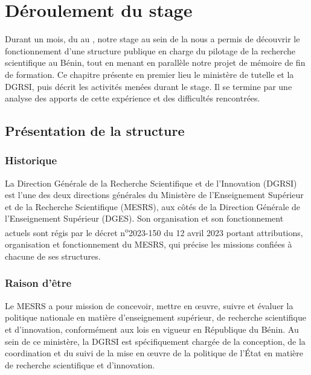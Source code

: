 \chapter{D\'eroulement du stage}
\label{chap:deroulement}

Durant un mois, du \datedebut{} au \datefin{}, notre stage au sein de la
\entreprise{} nous a permis de d\'ecouvrir le fonctionnement d'une structure
publique en charge du pilotage de la recherche scientifique au B\'enin, tout en
menant en parall\`ele notre projet de m\'emoire de fin de formation. Ce chapitre
pr\'esente en premier lieu le minist\`ere de tutelle et la DGRSI, puis d\'ecrit les
activit\'es men\'ees durant le stage. Il se termine par une analyse des apports de
cette exp\'erience et des difficult\'es rencontr\'ees.

\section{Pr\'esentation de la structure}

\subsection{Historique}

La Direction G\'en\'erale de la Recherche Scientifique et de l'Innovation
(DGRSI) est l'une des deux directions g\'en\'erales du Minist\`ere de
l'Enseignement Sup\'erieur et de la Recherche Scientifique (MESRS), aux c\^ot\'es
de la Direction G\'en\'erale de l'Enseignement Sup\'erieur (DGES). Son
organisation et son fonctionnement actuels sont r\'egis par le d\'ecret
n\textsuperscript{o}2023-150 du 12 avril 2023 portant attributions,
organisation et fonctionnement du MESRS, qui pr\'ecise les missions confi\'ees \`a
chacune de ses structures.

\subsection{Raison d'\^etre}

Le MESRS a pour mission de concevoir, mettre en \oe uvre, suivre et \'evaluer la
politique nationale en mati\`ere d'enseignement sup\'erieur, de recherche
scientifique et d'innovation, conform\'ement aux lois en vigueur en R\'epublique
du B\'enin. Au sein de ce minist\`ere, la DGRSI est sp\'ecifiquement charg\'ee de la
conception, de la coordination et du suivi de la mise en \oe uvre de la
politique de l'\'Etat en mati\`ere de recherche scientifique et d'innovation.

